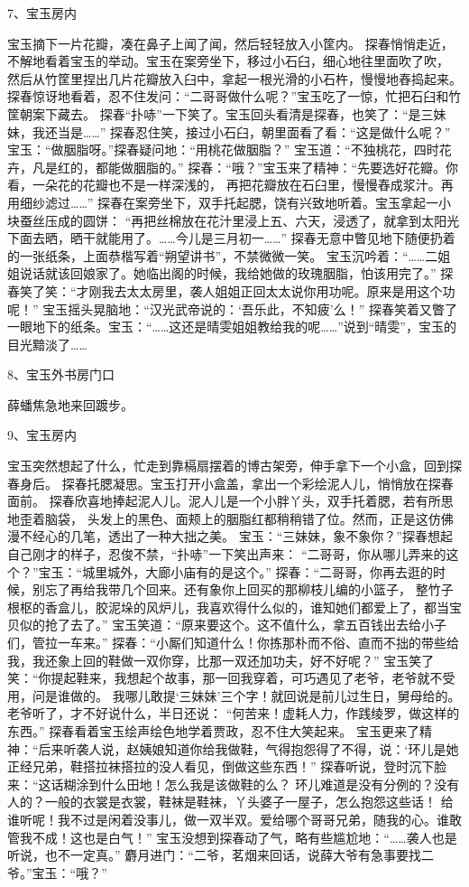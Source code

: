 7、宝玉房内\par
宝玉摘下一片花瓣，凑在鼻子上闻了闻，然后轻轻放入小筐内。
探春悄悄走近，不解地看着宝玉的举动。宝玉在案旁坐下，移过小石臼，细心地往里面吹了吹，
然后从竹筐里捏出几片花瓣放入臼中，拿起一根光滑的小石杵，慢慢地舂捣起来。
探春惊讶地看着，忍不住发问：“二哥哥做什么呢？”宝玉吃了一惊，忙把石臼和竹筐朝案下藏去。
探春“扑哧”一下笑了。宝玉回头看清是探春，也笑了：“是三妹妹，我还当是……”
探春忍住笑，接过小石臼，朝里面看了看：“这是做什么呢？”
宝玉：“做胭脂呀。”探春疑问地：“用桃花做胭脂？”
宝玉道：“不独桃花，四时花卉，凡是红的，都能做胭脂的。”
探春：“哦？”宝玉来了精神：“先要选好花瓣。你看，一朵花的花瓣也不是一样深浅的，
再把花瓣放在石臼里，慢慢舂成浆汁。再用细纱滤过……”
探春在案旁坐下，双手托起腮，饶有兴致地听着。宝玉拿起一小块蚕丝压成的圆饼：
“再把丝棉放在花汁里浸上五、六天，浸透了，就拿到太阳光下面去晒，晒干就能用了。……今儿是三月初一……”
探春无意中瞥见地下随便扔着的一张纸条，上面恭楷写着“朔望讲书”，不禁微微一笑。
宝玉沉吟着：“……二姐姐说话就该回娘家了。她临出阁的时候，我给她做的玫瑰胭脂，怕该用完了。”
探春笑了笑：“才刚我去太太房里，袭人姐姐正回太太说你用功呢。原来是用这个功呢！”
宝玉摇头晃脑地：“汉光武帝说的：‘吾乐此，不知疲’么！”
探春笑着又瞥了一眼地下的纸条。宝玉：“……这还是晴雯姐姐教给我的呢……”说到“晴雯”，宝玉的目光黯淡了……

8、宝玉外书房门口\par
薛蟠焦急地来回踱步。

9、宝玉房内\par
宝玉突然想起了什么，忙走到靠槅扇摆着的博古架旁，伸手拿下一个小盒，回到探春身后。
探春托腮凝思。宝玉打开小盒盖，拿出一个彩绘泥人儿，悄悄放在探春面前。
探春欣喜地捧起泥人儿。泥人儿是一个小胖丫头，双手托着腮，若有所思地歪着脑袋，
头发上的黑色、面颊上的胭脂红都稍稍错了位。然而，正是这仿佛漫不经心的几笔，透出了一种大拙之美。
宝玉：“三妹妹，象不象你？”探春想起自己刚才的样子，忍俊不禁，“扑哧”一下笑出声来：
“二哥哥，你从哪儿弄来的这个？”宝玉：“城里城外，大廊小庙有的是这个。”
探春：“二哥哥，你再去逛的时候，别忘了再给我带几个回来。还有象你上回买的那柳枝儿编的小篮子，
整竹子根枢的香盒儿，胶泥垛的风炉儿，我喜欢得什么似的，谁知她们都爱上了，都当宝贝似的抢了去了。”
宝玉笑道：“原来要这个。这不值什么，拿五百钱出去给小子们，管拉一车来。”
探春：“小厮们知道什么！你拣那朴而不俗、直而不拙的带些给我，我还象上回的鞋做一双你穿，比那一双还加功夫，好不好呢？”
宝玉笑了笑：“你提起鞋来，我想起个故事，那一回我穿着，可巧遇见了老爷，老爷就不受用，问是谁做的。
我哪儿敢提‘三妹妹’三个字！就回说是前儿过生日，舅母给的。老爷听了，才不好说什么，半日还说：
“何苦来！虚耗人力，作践绫罗，做这样的东西。”
探春看着宝玉绘声绘色地学着贾政，忍不住大笑起来。
宝玉更来了精神：“后来听袭人说，赵姨娘知道你给我做鞋，气得抱怨得了不得，说：‘环儿是她正经兄弟，鞋搭拉袜搭拉的没人看见，倒做这些东西！”
探春听说，登时沉下脸来：“这话糊涂到什么田地！怎么我是该做鞋的么？
环儿难道是没有分例的？没有人的？一般的衣裳是衣裳，鞋袜是鞋袜，丫头婆子一屋子，怎么抱怨这些话！
给谁听呢！我不过是闲着没事儿，做一双半双。爱给哪个哥哥兄弟，随我的心。谁敢管我不成！这也是白气！”
宝玉没想到探春动了气，略有些尴尬地：“……袭人也是听说，也不一定真。”
麝月进门：“二爷，茗烟来回话，说薛大爷有急事要找二爷。”宝玉：“哦？”

